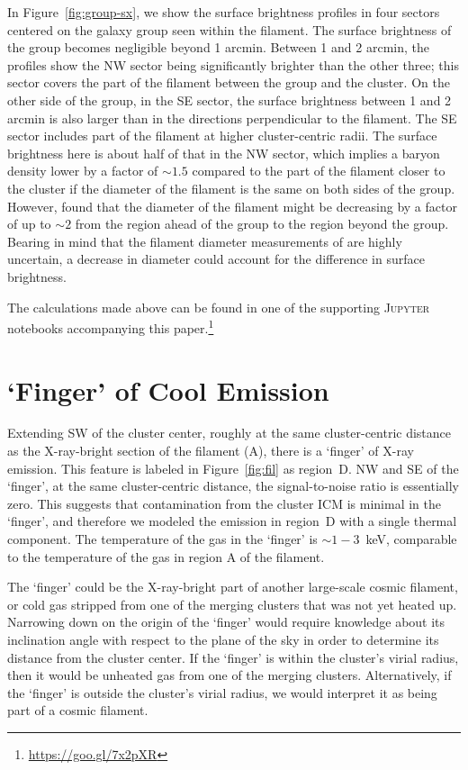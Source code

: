 \documentclass[11pt,a4paper,useAMS,iop]{emulateapj}
\begin{document}
In Figure~\ref{fig:group-sx}, we show the surface brightness profiles in four sectors centered on the galaxy group seen within the filament. The surface brightness of the group becomes negligible beyond 1 arcmin. Between 1 and 2 arcmin, the profiles show the NW sector being significantly brighter than the other three; this sector covers the part of the filament between the group and the cluster. On the other side of the group, in the SE sector, the surface brightness between 1 and 2 arcmin is also larger than in the directions perpendicular to the filament. The SE sector includes part of the filament at higher cluster-centric radii. The surface brightness here is about half of that in the NW sector, which implies a baryon density lower by a factor of $\sim 1.5$ compared to the part of the filament closer to the cluster if the diameter of the filament is the same on both sides of the group. However, \citet{Jauzac2012} found that the diameter of the filament might be decreasing by a factor of up to $\sim 2$ from the region ahead of the group to the region beyond the group. Bearing in mind that the filament diameter measurements of \citet{Jauzac2012} are highly uncertain, a decrease in diameter could account for the difference in surface brightness.

The calculations made above can be found in one of the supporting \textsc{Jupyter} notebooks accompanying this paper.\footnote{\url{https://goo.gl/7x2pXR}}

\section{`Finger' of Cool Emission}
\label{sec:finger}

Extending SW of the cluster center, roughly at the same cluster-centric distance as the X-ray-bright section of the filament (A), there is a `finger' of X-ray emission. This feature is labeled in Figure~\ref{fig:fil} as region~D. NW and SE of the `finger', at the same cluster-centric distance, the signal-to-noise ratio is essentially zero. This suggests that contamination from the cluster ICM is minimal in the `finger', and therefore we modeled the emission in region~D with a single thermal component. The temperature of the gas in the `finger' is $\sim 1-3$~keV, comparable to the temperature of the gas in region A of the filament.

The `finger' could be the X-ray-bright part of another large-scale cosmic filament, or cold gas stripped from one of the merging clusters that was not yet heated up. Narrowing down on the origin of the `finger' would require knowledge about its inclination angle with respect to the plane of the sky in order to determine its distance from the cluster center. If the `finger' is within the cluster's virial radius, then it would be unheated gas from one of the merging clusters. Alternatively, if the `finger' is outside the cluster's virial radius, we would interpret it as being part of a cosmic filament. 
\end{document}
